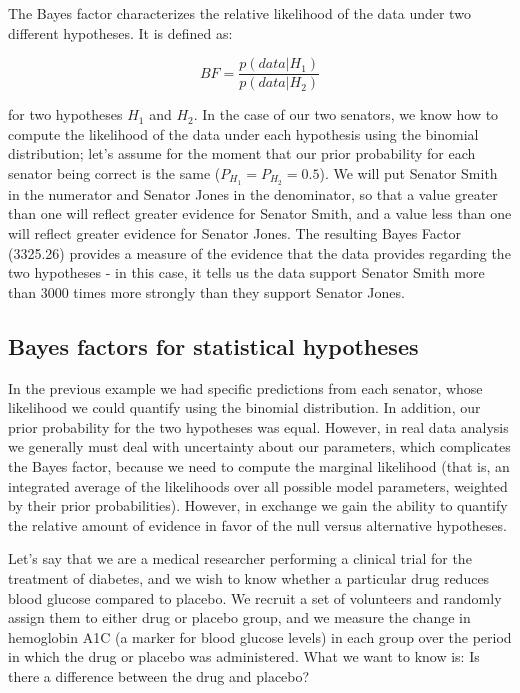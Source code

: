 \documentclass[
  12pt,
]{book}
\begin{document}
The Bayes factor characterizes the relative likelihood of the data under two different hypotheses. It is defined as:

\[
BF = \frac{p(data|H_1)}{p(data|H_2)}
\]

for two hypotheses \(H_1\) and \(H_2\). In the case of our two senators, we know how to compute the likelihood of the data under each hypothesis using the binomial distribution; let's assume for the moment that our prior probability for each senator being correct is the same (\(P_{H_1} = P_{H_2} = 0.5\)). We will put Senator Smith in the numerator and Senator Jones in the denominator, so that a value greater than one will reflect greater evidence for Senator Smith, and a value less than one will reflect greater evidence for Senator Jones. The resulting Bayes Factor (3325.26) provides a measure of the evidence that the data provides regarding the two hypotheses - in this case, it tells us the data support Senator Smith more than 3000 times more strongly than they support Senator Jones.

\hypertarget{bayes-factors-for-statistical-hypotheses}{%
\subsection{Bayes factors for statistical hypotheses}\label{bayes-factors-for-statistical-hypotheses}}

In the previous example we had specific predictions from each senator, whose likelihood we could quantify using the binomial distribution. In addition, our prior probability for the two hypotheses was equal. However, in real data analysis we generally must deal with uncertainty about our parameters, which complicates the Bayes factor, because we need to compute the marginal likelihood (that is, an integrated average of the likelihoods over all possible model parameters, weighted by their prior probabilities). However, in exchange we gain the ability to quantify the relative amount of evidence in favor of the null versus alternative hypotheses.

Let's say that we are a medical researcher performing a clinical trial for the treatment of diabetes, and we wish to know whether a particular drug reduces blood glucose compared to placebo. We recruit a set of volunteers and randomly assign them to either drug or placebo group, and we measure the change in hemoglobin A1C (a marker for blood glucose levels) in each group over the period in which the drug or placebo was administered. What we want to know is: Is there a difference between the drug and placebo?
\end{document}

